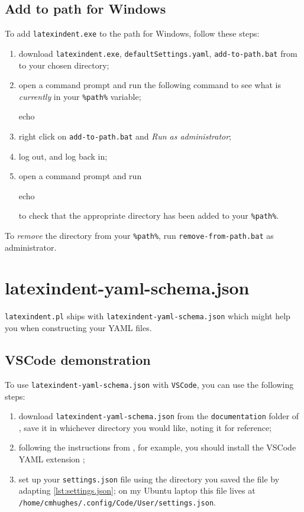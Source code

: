 	\subsection{Add to path for Windows}
		To add \texttt{latexindent.exe} to the path for Windows, follow these steps:
		\begin{enumerate}
			\item download \texttt{latexindent.exe}, \texttt{defaultSettings.yaml},
			      \texttt{add-to-path.bat} from \cite{latexindent-home} to your chosen directory;
			\item open a command prompt and run the following command to see what is \emph{currently} in
			      your \lstinline!%path%! variable;
			      \begin{dosprompt}
echo %
          \end{dosprompt}
			\item right click on \texttt{add-to-path.bat} and \emph{Run as administrator};
			\item log out, and log back in;
			\item open a command prompt and run
			      \begin{dosprompt}
echo %
          \end{dosprompt}
			      to check that the appropriate directory has been added to your \lstinline!%path%!.
		\end{enumerate}
		To \emph{remove} the directory from your \lstinline!%path%!, run
		\texttt{remove-from-path.bat} as administrator.

	\section{latexindent-yaml-schema.json}

	 \texttt{latexindent.pl}
	  ships with
	 \texttt{latexindent-yaml-schema.json}
	 which might help you when constructing your YAML files.

	\subsection{VSCode demonstration}
		To use \texttt{latexindent-yaml-schema.json} with \texttt{VSCode}, you can use the
		following steps:
		\begin{enumerate}
			\item download \texttt{latexindent-yaml-schema.json} from the \texttt{documentation} folder of
			      \cite{latexindent-home}, save it in whichever directory you would like, noting it for
			      reference;
			\item following the instructions from \cite{vscode-yaml-demo}, for example, you should install
			      the VSCode YAML extension \cite{vscode-yaml-extentions};
			\item set up your \texttt{settings.json} file using the directory you saved the file by
			      adapting \cref{lst:settings.json}; on my Ubuntu laptop this file lives at
			      \texttt{/home/cmhughes/.config/Code/User/settings.json}.
		\end{enumerate}

